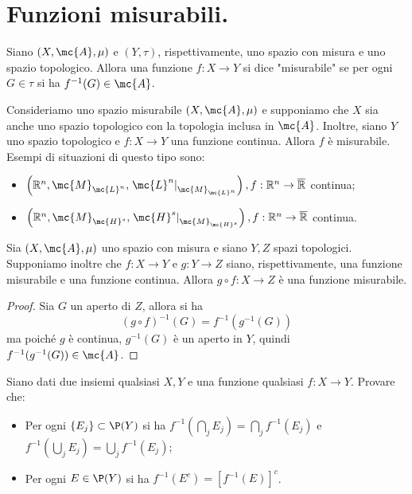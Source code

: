\section{Funzioni misurabili.}
\begin{boxdef}
    Siano $(X, \mc{A}, \mu)$ e $(Y, \tau)$, rispettivamente, uno spazio con misura e uno spazio topologico. Allora una funzione $f: X \rightarrow Y$ si dice "misurabile" se per ogni $G \in \tau$ si ha $f^{-1}(G) \in \mc{A}$.
\end{boxdef}
\begin{oss}Consideriamo uno spazio misurabile $(X, \mc{A}, \mu)$ e supponiamo che $X$ sia anche uno spazio topologico con la topologia inclusa in $\mc{A}$. Inoltre, siano $Y$ uno spazio topologico e $f: X \rightarrow Y$ una funzione continua. Allora $f$ è misurabile. Esempi di situazioni di questo tipo sono:
\begin{itemize}
  \item $\left(\mathbb{R}^{n}, \mc{M}_{\mc{L}^{n}},\left.\mc{L}^{n}\right|_{\mc{M}_{\mc{L}^{n}}}\right), f: \mathbb{R}^{n} \rightarrow \overline{\mathbb{R}}$ continua;
  \item $\left(\mathbb{R}^{n}, \mc{M}_{\mc{H}^{s}},\left.\mc{H}^{s}\right|_{\mc{M}_{\mc{H}^{s}}}\right), f: \mathbb{R}^{n} \rightarrow \overline{\mathbb{R}}$ continua.
\end{itemize}
\end{oss}

\begin{proposition}[$\circ$] \label{prop: composizione funzioni continue misurabili} Sia $(X, \mc{A}, \mu)$ uno spazio con misura e siano $Y, Z$ spazi topologici. Supponiamo inoltre che $f: X \rightarrow Y$ e $g: Y \rightarrow Z$ siano, rispettivamente, una funzione misurabile e una funzione continua. Allora $g \circ f: X \rightarrow Z$ è una funzione misurabile.
\end{proposition}
\begin{proof}
    Sia $G$ un aperto di $Z$, allora si ha 
    \[(g\circ f)^{-1}(G)=f^{-1}(g^{-1}(G))\]
    ma poiché $g$ è continua, $g^{-1}(G)$ è un aperto in $Y$, quindi $f^{-1}(g^{-1}(G))\in \mc{A}$.
\end{proof}

\begin{exc}Siano dati due insiemi qualsiasi $X, Y$ e una funzione qualsiasi $f: X \rightarrow Y$. Provare che:
    \begin{itemize}
        \item Per ogni $\left\{E_{j}\right\} \subset \P(Y)$ si ha $f^{-1}\left(\bigcap_{j} E_{j}\right)=\bigcap_{j} f^{-1}\left(E_{j}\right)$ e $f^{-1}\left(\bigcup_{j} E_{j}\right)=\bigcup_{j} f^{-1}\left(E_{j}\right)$;
        \item Per ogni $E \in \P(Y)$ si ha $f^{-1}\left(E^{c}\right)=\left[f^{-1}(E)\right]^{c}$.
    \end{itemize}
\end{exc}


